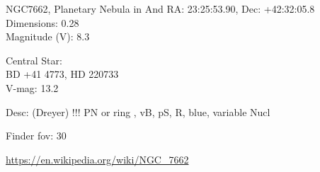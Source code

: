 \begin{block}{NGC7662, Planetary Nebula in And}
    RA: 23:25:53.90, Dec: +42:32:05.8 \\ 
    Dimensions: 0.28 \\ 
    Magnitude (V): 8.3

    Central Star: \\ 
      \hspace{1em}BD +41 4773, HD 220733 \\ 
      \hspace{1em}V-mag: 13.2 

    Desc: (Dreyer) !!! PN  or ring , vB, pS, R, blue, variable Nucl 

    Finder fov: 30 

    \url{https://en.wikipedia.org/wiki/NGC_7662} 
\end{block}